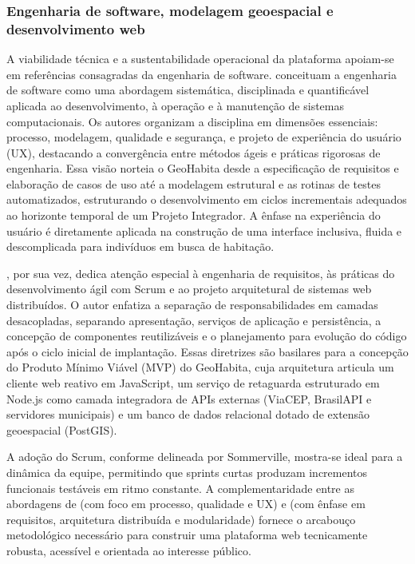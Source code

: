 \documentclass[
    12pt,
    oneside,            %
    a4paper,
    brazilian
    ]{abntex2}
\begin{document}
\subsubsection{Engenharia de software, modelagem geoespacial e desenvolvimento web}
A viabilidade técnica e a sustentabilidade operacional da plataforma apoiam-se em referências consagradas da engenharia de software.  conceituam a engenharia de software como uma abordagem sistemática, disciplinada e quantificável aplicada ao desenvolvimento, à operação e à manutenção de sistemas computacionais. Os autores organizam a disciplina em dimensões essenciais: processo, modelagem, qualidade e segurança, e projeto de experiência do usuário (UX), destacando a convergência entre métodos ágeis e práticas rigorosas de engenharia. Essa visão norteia o GeoHabita desde a especificação de requisitos e elaboração de casos de uso até a modelagem estrutural e as rotinas de testes automatizados, estruturando o desenvolvimento em ciclos incrementais adequados ao horizonte temporal de um Projeto Integrador. A ênfase na experiência do usuário é diretamente aplicada na construção de uma interface inclusiva, fluida e descomplicada para indivíduos em busca de habitação.

, por sua vez, dedica atenção especial à engenharia de requisitos, às práticas do desenvolvimento ágil com Scrum e ao projeto arquitetural de sistemas web distribuídos. O autor enfatiza a separação de responsabilidades em camadas desacopladas, separando apresentação, serviços de aplicação e persistência, a concepção de componentes reutilizáveis e o planejamento para evolução do código após o ciclo inicial de implantação. Essas diretrizes são basilares para a concepção do Produto Mínimo Viável (MVP) do GeoHabita, cuja arquitetura articula um cliente web reativo em JavaScript, um serviço de retaguarda estruturado em Node.js como camada integradora de APIs externas (ViaCEP, BrasilAPI e servidores municipais) e um banco de dados relacional dotado de extensão geoespacial (PostGIS).

A adoção do Scrum, conforme delineada por Sommerville, mostra-se ideal para a dinâmica da equipe, permitindo que sprints curtas produzam incrementos funcionais testáveis em ritmo constante. A complementaridade entre as abordagens de  (com foco em processo, qualidade e UX) e  (com ênfase em requisitos, arquitetura distribuída e modularidade) fornece o arcabouço metodológico necessário para construir uma plataforma web tecnicamente robusta, acessível e orientada ao interesse público.
\end{document}
